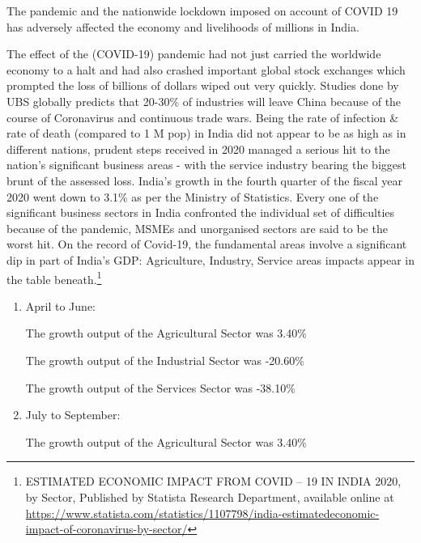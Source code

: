 \begin{multicols}{2}

\noi
The pandemic and the nationwide lockdown imposed on account of COVID 19 has adversely
affected the economy and livelihoods of millions in India.


\noi
The effect of the (COVID-19) pandemic had not just carried the worldwide economy to a halt
and had also crashed important global stock exchanges which prompted the loss of billions of
dollars wiped out very quickly. Studies done by UBS globally predicts that 20-30\% of
industries will leave China because of the course of Coronavirus and continuous trade wars.
Being the rate of infection \& rate of death (compared to 1 M pop) in India did not appear to
be as high as in different nations, prudent steps received in 2020 managed a serious hit to the
nation's significant business areas - with the service industry bearing the biggest brunt of the
assessed loss. India's growth in the fourth quarter of the fiscal year 2020 went down to 3.1\%
as per the Ministry of Statistics. Every one of the significant business sectors in India
confronted the individual set of difficulties because of the pandemic, MSMEs and
unorganised sectors are said to be the worst hit. On the record of Covid-19, the fundamental
areas involve a significant dip in part of India's GDP: Agriculture, Industry, Service areas
impacts appear in the table beneath.\footnote{ESTIMATED ECONOMIC IMPACT FROM COVID – 19 IN INDIA 2020, by Sector, Published by Statista Research Department, available online at  \url{https://www.statista.com/statistics/1107798/india-estimatedeconomic-impact-of-coronavirus-by-sector/}}

\vspace{-.3cm}

\begin{enumerate}[label=$\blacktriangleright$]
\itemsep=0pt

\item April to June:

The growth output of the Agricultural Sector was 3.40\%

The growth output of the Industrial Sector was -20.60\%

The growth output of the Services Sector was -38.10\%

\item July to September:

The growth output of the Agricultural Sector was 3.40\%


\end{enumerate}
\end{multicols}
